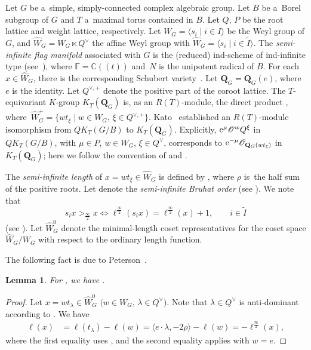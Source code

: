 \documentclass[10pt,a4paper]{amsart}
\numberwithin{equation}{section}
\newcommand{\C}{\mathbb{C}}
\newcommand{\Iaf}{\tilde{I}}
\renewcommand{\O}{\mathscr{O}}
\newcommand{\sinf}{\frac{\infty}{2}}
\newtheorem{Lemma}[Theorem]{Lemma}
\theoremstyle{definition}
\begin{document}
Let $G$ be a~simple, simply-connected complex algebraic group. Let $B$ be a~Borel subgroup of $G$ and $T$ a~maximal torus contained in $B$.
Let $Q$, $P$ be the root lattice and weight lattice, respectively.
Let $W_G=\langle s_i \mid i\in I\rangle$ be the Weyl group of $G$, and $\hat{W}_G=W_G\ltimes Q^\lor$ the affine Weyl group with $\hat{W}_G=\big\langle s_i \mid i\in \Iaf\big\rangle$.
The \emph{semi-infinite flag manifold} associated with $G$
is the (reduced) ind-scheme of ind-infinite type \smash{$\mathbf{Q}_G^{\mathrm{rat}}= G(\mathbb{F})/(T(\C)N(\mathbb{F}))$} (see~\cite{K:Fro,KNS}), where $\mathbb{F}=\C(\!(t)\!)$ and~$N$ is the unipotent radical of $B$. For each $x\in \hat{W}_G$, there is the corresponding Schubert variety~. Let $\mathbf{Q}_G=\mathbf{Q}_G(e)$, where $e$ is the identity.
Let $Q^{\lor,+}$ denote the positive part of the coroot lattice.
The $T$-equivariant $K$-group $K_T(\mathbf{Q}_G)$ is, as an $R(T)$-module, the direct product \smash{$\prod_{x\in \hat{W}_{G}^{+}}R(T)\O_{\mathbf{Q}_G(x)}$}, where~${\hat{W}_{G}^{+}=
\big\{wt_\xi\mid w\in W_G,\, \xi\in Q^{\lor,+}\big\}}$.
Kato~\cite{Kato} established an $R(T)$-module isomorphism from
$QK_T(G/B)$ to $K_T(\mathbf{Q}_G)$.
Explicitly,
${\rm e}^\mu \O^wQ^\xi$ in $QK_T(G/B)$, with $\mu\in P$, $w\in W_G$, $\xi \in Q^\lor$,
corresponds to
${\rm e}^{-\mu}\O_{\mathbf{Q}_G(wt_\xi)}$
in $K_T(\mathbf{Q}_G)$; here we follow the convention of \cite[Section~6.1]{LNS:Se} and \cite[Section~5]{MNS1}.


The \emph{semi-infinite length} of $x=wt_\xi\in \hat{W}_G$
is defined by
\smash{$\ell^\sinf(w)
=\ell(w)+2\langle \rho,\xi\rangle$}, where $\rho$ is~the half sum of the positive roots.
Let \smash{$\le_\sinf$} denote the \emph{semi-infinite Bruhat order} (see \cite[Section~2.4]{INS}).
We note that
\[
s_i x>_\sinf x\Longleftrightarrow \ell^\sinf(s_ix)=\ell^\sinf(x)+1, \qquad i\in \tilde{I}
\] (see \cite[Lemma~4.1.2]{INS}).
Let $\hat{W}_G^0$ denote the minimal-length coset representatives for the coset space $\hat{W}_G/W_G$
with respect to the ordinary length function.

The following fact is due to Peterson~\cite{Pet}.
\begin{Lemma}\label{lem:sinf}
For , we have
\smash{$\ell(x)=-\ell^{\sinf}(x)$}.
\end{Lemma}
\begin{proof}
Let $x=wt_\lambda\in \hat{W}_G^0$ $\bigl(w\in W_G, \, \lambda\in Q^\vee\bigr)$. Note that $\lambda\in Q^\vee$ is anti-dominant according to \cite[Lemma 3.3]{LS:Acta}.
We have
\begin{align*}
 \ell(x)&=\ell(t_\lambda)-\ell(w)=\langle e\cdot \lambda,-2\rho\rangle-\ell(w)=-\ell^\sinf(x),
\end{align*}
where the first equality uses \cite[Lemma 3.3]{LS:Acta}, and the second equality applies \cite[Lemma 3.2]{LS:Acta} with $w=e$.
\end{proof}
\end{document}
